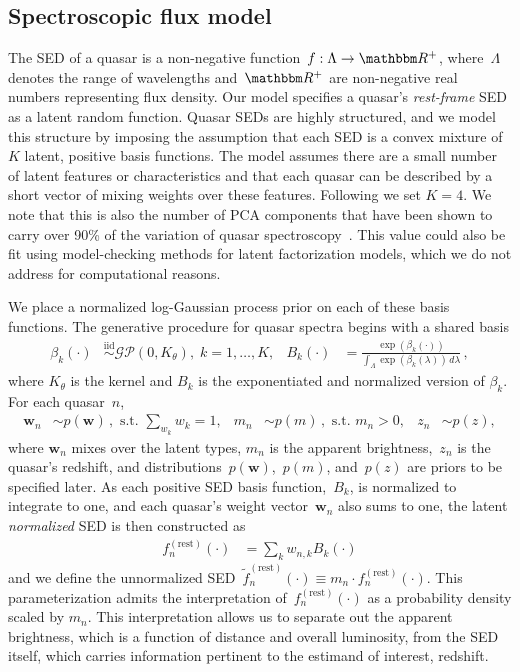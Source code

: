 \documentclass{article} %
\begin{document}
\subsection{Spectroscopic flux model}
The SED of a quasar is a non-negative function~${f : \Lambda \rightarrow \R^+}$, where~$\Lambda$ denotes the range of wavelengths and~$\R^+$ are non-negative real numbers representing flux density.
Our model specifies a quasar's \emph{rest-frame} SED as a latent random function. 
Quasar SEDs are highly structured, and we model this structure by imposing the assumption that each SED is a convex mixture of~$K$ latent, positive basis functions. 
The model assumes there are a small number of latent features or characteristics and that each quasar can be described by a short vector of mixing weights over these features.  
Following \cite{budavari2001photometric} we set ${K = 4}$. 
We note that this is also the number of PCA components that have been shown to carry over 90\% of the variation of quasar spectroscopy~\cite{suzuki2006quasar}.  
This value could also be fit using model-checking methods for latent factorization models, which we do not address for computational reasons.

We place a normalized log-Gaussian process prior on each of these basis functions.  
The generative procedure for quasar spectra begins with a shared basis
\begin{align}
  \beta_k(\cdot) &\stackrel{\text{iid}}{\sim} \mathcal{GP}(0, K_\theta),\; k=1, \dots, K,&
  B_k(\cdot) &= \frac{\exp(\beta_k(\cdot))}{\int_\Lambda \exp(\beta_k(\lambda))\, d\lambda}   \, ,
\end{align}
where $K_{\theta}$ is the kernel and $B_k$ is the exponentiated and normalized version of $\beta_k$. For each quasar~$n$,
\begin{align}
  \mathbf{w}_n &\sim p(\mathbf{w}) \, , \text{ s.t. } \sum_{w_k} w_k = 1, &
  m_n  &\sim p(m) \, , \text{ s.t. } m_n > 0, &
  z_n &\sim p(z),
\end{align}
where $\mathbf{w}_n$ mixes over the latent types, $m_n$ is the apparent brightness,~$z_n$ is the quasar's redshift, and distributions~$p(\mathbf{w})$,~$p(m)$, and~$p(z)$ are priors to be specified later.
As each positive SED basis function,~$B_k$, is normalized to integrate to one, and each quasar's weight vector~$\mathbf{w}_n$ also sums to one, the latent \emph{normalized} SED is then constructed as
\begin{align}
  f^{(\text{rest})}_n(\cdot) &= \sum_{k} w_{n,k} B_k(\cdot)
  \label{eqn:restsed}
\end{align}
and we define the unnormalized SED~${\tilde f^{(\text{rest})}_n(\cdot) \equiv m_n \cdot f^{(\text{rest})}_n(\cdot)}$. 
This parameterization admits the interpretation of~$f^{(\text{rest})}_n(\cdot)$ as a probability density scaled by $m_n$.  
This interpretation allows us to separate out the apparent brightness, which is a function of distance and overall luminosity, from the SED itself, which carries information pertinent to the estimand of interest, redshift. 
\end{document}
